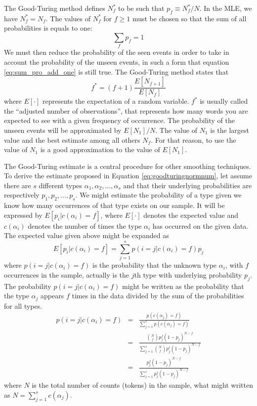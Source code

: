 The Good-Turing method \citep{Good1953} defines $N_f^\ast$ to be such that $p_f \equiv N_f^\ast / N$.
In the MLE, we have $N_f^\ast = N_f$. The values of $N_f^\ast$ for $f \geq 1$ must
be chosen so that the sum of all probabilities is equals to one: 
\begin{equation}
\label{eq:sum_pro_add_one}
\sum_f p_f = 1
\end{equation}
We must then reduce the probability of the seen events in order to take in account
the probability of the unseen events, in such a form that equation \ref{eq:sum_pro_add_one}
is still true. The Good-Turing method states that
\begin{equation}
\label{eq:goodturingnormnum}
f^\ast = (f + 1) \frac{E[N_{f+1}]}{E[N_f]}
\end{equation}
where $E[\cdot]$ represents the expectation of a random variable.
$f^\ast$ is usually called the ``adjusted number of observations'', that
represents how many words you are expected to see with a given frequency of occurrence.
The probability of the unseen events will be approximated by $E[N_1]/N$.
The value of $N_1$ is the largest value and the best estimate among all others $N_f$.
For that reason, to use the value of $N_1$ is a good approximation to the value of $E[N_1]$.


The Good-Turing estimate is a central procedure for other smoothing techniques. To derive the
estimate proposed in Equation \ref{eq:goodturingnormnum}, let assume there are $s$ different types
$\alpha_1, \alpha_2, \ldots, \alpha_s$ and that their underlying probabilities are respectively
$p_1, p_2, \ldots, p_s$.  We might estimate the probability of a type given we know how many
occurrences of that type exists on our sample. It will be expressed by $E[p_i | c(\alpha_i) = f]$,
where $E[\cdot]$ denotes the expected value and $c(\alpha_i)$ denotes the number of times the
type $\alpha_i$ has occurred on the given data. The expected value given above might
be expanded as
\begin{equation}
\label{eq:Epicif}
E[p_i | c(\alpha_i) = f] = \sum_{j=1}^{s} p(i=j | c(\alpha_i) = f) p_j
\end{equation}
where $p(i=j | c(\alpha_i) = f)$ is the probability that the unknown type $\alpha_i$, with $f$ occurrences
in the sample, actually is the $j$th type with underlying probability $p_j$. The probability
$p(i=j | c(\alpha_i) = f)$ might be written as the probability that the type $\alpha_j$ appears $f$
times in the data divided by the sum of the probabilities for all types.
\begin{eqnarray}
\label{eq:pijcif}
p(i=j | c(\alpha_i) = f) &=& \frac{p(c(\alpha_j) = f)}{\sum_{j=1}^{s} p(c(\alpha_j) = f)} \nonumber \\
         &=& \frac{ {N \choose f} p_j^f (1-p_j)^{N-f} }{ \sum_{j=1}^{s} {N \choose f} p_j^r (1-p_j)^{N-f} }  \nonumber \\
         &=& \frac{ p_j^f (1-p_j)^{N-f} }{ \sum_{j=1}^{s} p_j^f (1-p_j)^{N-f} }
\end{eqnarray}
where $N$ is the total number of counts (tokens) in the sample, what might written as $N = \sum_{j=1}^{s} c(\alpha_j)$.

